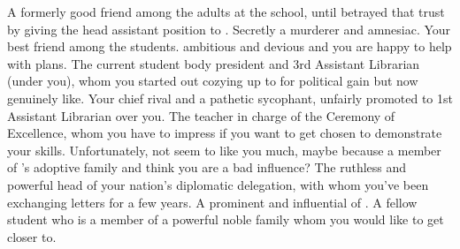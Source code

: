 \documentclass[char]{GL2020}
\begin{document}
\begin{contacts}
    \contact{\cLibrarian{}} A formerly good friend among the adults at the school, until \cLibrarian{\they} betrayed that trust by giving the head assistant position to \cAmbition{}. Secretly a murderer and amnesiac.
    \contact{\cAdopted{}} Your best friend among the students. \cAdopted{\Theyare} ambitious and devious and you are happy to help \cAdopted{\them} with \cAdopted{\their} plans.
    \contact{\cPresident{}} The current student body president and 3rd Assistant Librarian (under you), whom you started out cozying up to for political gain but now genuinely like.
    \contact{\cAmbition{}} Your chief rival and a pathetic sycophant, unfairly promoted to 1st Assistant Librarian over you.
    \contact{\cMusic{}} The teacher in charge of the Ceremony of Excellence, whom you have to impress if you want to get chosen to demonstrate your skills. Unfortunately, \cMusic{\theydo} not seem to like you much, maybe because \cMusic{\theyare} a member of \cAdopted{}’s adoptive family and think\cMusic{\verbs} you are a bad influence?
    \contact{\cEvil{}} The ruthless and powerful head of your nation’s diplomatic delegation, with whom you’ve been exchanging letters for a few years.
    \contact{\cHedonist{}} A prominent and influential \cHedonist{\cleric} of \cFarmGod{\intro}.
    \contact{\cChupStudent{}} A fellow student who is a member of a powerful noble family whom you would like to get closer to.
\end{contacts}
\end{document}
